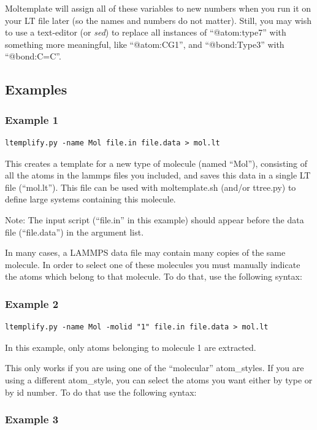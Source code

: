 \documentclass[11pt]{article}
\begin{document}
Moltemplate will assign all of these variables to new numbers 
when you run it on your LT file later (so the names and numbers do not matter).
Still, you may wish to use a text-editor (or \textit{sed}) to replace all
instances of ``@atom:type7'' with something more meaningful, like ``@atom:CG1'',
and ``@bond:Type3'' with ``@bond:C=C''.


\subsection{Examples}
\subsubsection*{Example 1}

\begin{verbatim}
ltemplify.py -name Mol file.in file.data > mol.lt
\end{verbatim}

This creates a template for a new type of molecule (named ``Mol''),
consisting of all the atoms in the lammps files you included,
and saves this data in a single LT file (``mol.lt'').
This file can be used with moltemplate.sh (and/or ttree.py) to
define large systems containing this molecule.

Note: The input script (``file.in'' in this example) should appear 
      before the data file (``file.data'') in the argument list.

In many cases, a LAMMPS data file may contain many copies of the same
molecule.  In order to select one of these molecules you must manually
indicate the atoms which belong to that molecule.
To do that, use the following syntax:

\subsubsection*{Example 2}

\begin{verbatim}
ltemplify.py -name Mol -molid "1" file.in file.data > mol.lt
\end{verbatim}

    In this example, only atoms belonging to molecule 1 are extracted.

This only works if you are using one of the ``molecular'' atom\_styles.
If you are using a different atom\_style, you can select the atoms you want
either by type or by id number.  To do that use the following syntax:
\subsubsection*{Example 3}
\end{document}
